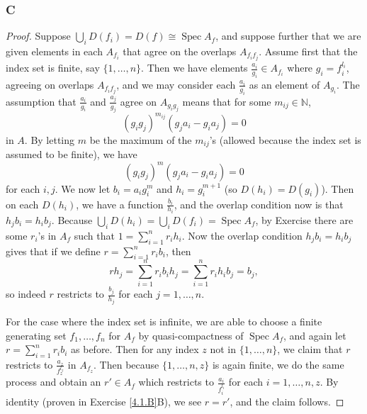 \documentclass{article}
\newcommand{\N}{\mathbb{N}}
\DeclareMathOperator{\Spec}{\mathrm{Spec}}
\theoremstyle{definition} %
\begin{document}
\subsubsection{C}\label{4.1.C}
\begin{proof}
    Suppose $\bigcup_i D(f_i) = D(f)\cong \Spec A_f$, and suppose further that we are given elements in each $A_{f_i}$ that agree on the overlaps $A_{f_i f_j}$. Assume first that the index set is finite, say $\{1, \dots, n\}$. Then we have elements $\frac{a_i}{g_i}\in A_{f_i}$ where $g_i=f_i^{l_i}$, agreeing on overlaps $A_{f_if_j}$, and we may consider each $\frac{a_i}{g_i}$ as an element of $A_{g_i}$. The assumption that $\frac{a_i}{g_i}$ and $\frac{a_j}{g_j}$ agree on $A_{g_ig_j}$ means that for some $m_{ij}\in \N$, $$(g_ig_j)^{m_{ij}}(g_j a_i - g_i a_j)=0$$ in $A$. By letting $m$ be the maximum of the $m_{ij}$'s (allowed because the index set is assumed to be finite), we have
    \[
    (g_i g_j)^m (g_j a_i - g_i a_j)=0
    \]
    for each $i,j$. We now let $b_i = a_i g_i^m$ and $h_i = g_i ^{m+1}$ (so $D(h_i)=D(g_i)$). Then on each $D(h_i)$, we have a function $\frac{b_i}{h_i}$, and the overlap condition now is that $h_j b_i = h_i b_j$. Because $\bigcup_i D(h_i)=\bigcup_i D(f_i)=\Spec A_f$, by Exercise  %
    there are some $r_i$'s in $A_f$ such that $1=\sum_{i=1}^n r_i h_i$. Now the overlap condition $h_jb_i=h_i b_j$ gives that if we define $r=\sum_{i=1}^n r_i b_i$, then
    \[
    rh_j = \sum_{i=1}^n r_i b_i h_j = \sum_{i=1}^n r_i h_i b_j = b_j,
    \]
    so indeed $r$ restricts to $\frac{b_j}{h_j}$ for each $j=1, \dots, n$.

    For the case where the index set is infinite, we are able to choose a finite generating set $f_1, \dots, f_n$ for $A_f$ by quasi-compactness of $\Spec A_f$, and again let $r=\sum_{i=1}^n r_i b_i$ as before. Then for any index $z$ not in $\{1, \dots, n\}$, we claim that $r$ restricts to $\frac{a_z}{f_z^{l_z}}$ in $A_{f_z}$. Then because $\{1, \dots, n , z\}$ is again finite, we do the same process and obtain an $r'\in A_f$ which restricts to $\frac{a_i}{f_i^{l_i}}$ for each $i=1, \dots, n, z$. By identity (proven in Exercise \ref{4.1.B}B), we see $r=r'$, and the claim follows.
\end{proof}
\end{document}
